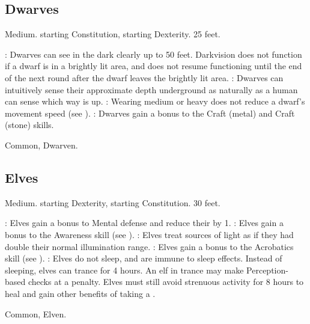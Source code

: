 \subsection{Dwarves}
 Medium.
  starting Constitution,  starting Dexterity.
 25 feet.
\begin{itemize}
    : Dwarves can see in the dark clearly up to 50 feet. Darkvision does not function if a dwarf is in a brightly lit area, and does not resume functioning until the end of the next round after the dwarf leaves the brightly lit area.
    : Dwarves can intuitively sense their approximate depth underground as naturally as a human can sense which way is up.
    : Wearing medium or heavy  does not reduce a dwarf's movement speed (see ).
    : Dwarves gain a  bonus to the Craft (metal) and Craft (stone) skills.
\end{itemize}
 Common, Dwarven.

\subsection{Elves}
 Medium.
  starting Dexterity,  starting Constitution.
 30 feet.
\begin{itemize}
    : Elves gain a  bonus to Mental defense and reduce their  by 1.
    : Elves gain a  bonus to the Awareness skill (see ).
    : Elves treat sources of light as if they had double their normal illumination range.
    : Elves gain a  bonus to the Acrobatics skill (see ).
    : Elves do not sleep, and are immune to sleep effects. Instead of sleeping, elves can trance for 4 hours. An elf in trance may make Perception-based checks at a  penalty. Elves must still avoid strenuous activity for 8 hours to heal and gain other benefits of taking a .
\end{itemize}
 Common, Elven.

